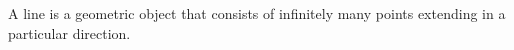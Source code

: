 \documentclass[preview]{standalone}
\begin{document}
\begin{center}
A line is a geometric object that consists of infinitely many points extending in a particular direction.
\end{center}
\end{document}
